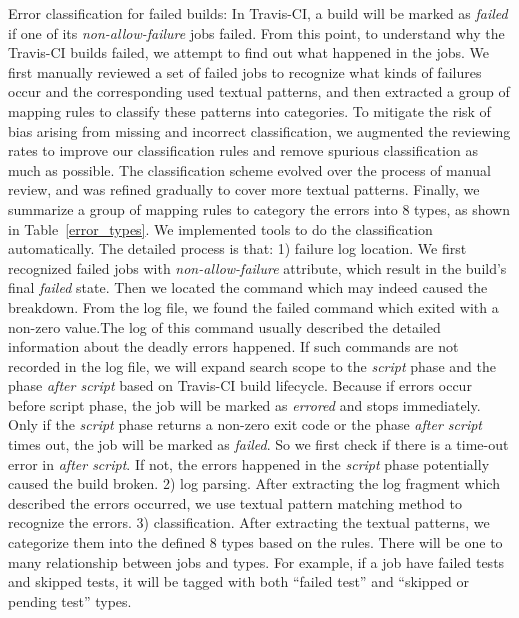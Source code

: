 
Error classification for failed builds: 
In Travis-CI, a build will be marked as \textit{failed} if one of its \textit{non-allow-failure} jobs failed. From this point, to understand why the Travis-CI builds failed, we attempt to find out what happened in the jobs. We first manually reviewed a set of failed jobs to recognize what kinds of failures occur and the corresponding used textual patterns, and then extracted a group of mapping rules to classify these patterns into categories. To mitigate the risk of bias arising from missing and incorrect classification, we augmented the reviewing rates to improve our classification rules and remove spurious classification as much as possible. The classification scheme evolved over the process of manual review, and was refined gradually to cover more textual patterns. Finally, we summarize a group of mapping rules to category the errors into 8 types, as shown in Table~\ref{error_types}. 
We implemented tools to do the classification automatically. The detailed process is that: 1) failure log location. We first recognized failed jobs with \textit{non-allow-failure} attribute, which result in the build's final \textit{failed} state. Then we located the command which may indeed caused the breakdown. From the log file, we found the failed command which exited with a non-zero value.The log of this command usually described the detailed information about the deadly errors happened. If such commands are not recorded in the log file, we will expand search scope to the \textit{script} phase and the phase \textit{after script} based on Travis-CI build lifecycle. Because if errors occur before script phase, the job will be marked as \textit{errored} and stops immediately. Only if the \textit{script} phase returns a non-zero exit code or the phase \textit{after script} times out, the job will be marked as \textit{failed}. So we first check if there is a time-out error in \textit{after script}. If not, the errors happened in the \textit{script} phase potentially caused the build broken. 
2) log parsing. After extracting the log fragment which described the errors occurred, we use textual pattern matching method to recognize the errors. 
3) classification. After extracting the textual patterns, we categorize them  into the defined 8 types based on the rules. There will be one to many relationship between jobs and types. For example, if a job have failed tests and skipped tests, it will be tagged with both “failed test” and “skipped or pending test” types.


